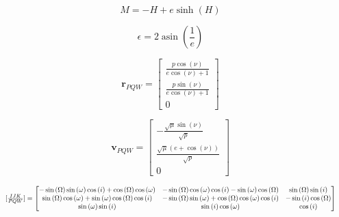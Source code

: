 \documentclass[10pt]{article}
\begin{document}
\begin{minipage}[t]{0.2487\textwidth}
\[M = - H + e \sinh{\left(H \right)}\]
\end{minipage}%
\begin{minipage}[t]{0.2487\textwidth}
\[\epsilon = 2 \operatorname{asin}{\left(\frac{1}{e} \right)}\]
\end{minipage}
\par\smallskip
\noindent\begin{minipage}[t]{0.2487\textwidth}
\[\mathbf{r}_{PQW} = \left[\begin{matrix}\frac{p \cos{\left(\nu \right)}}{e \cos{\left(\nu \right)} + 1}\\\frac{p \sin{\left(\nu \right)}}{e \cos{\left(\nu \right)} + 1}\\0\end{matrix}\right]\]
\end{minipage}%
\begin{minipage}[t]{0.2487\textwidth}
\[\mathbf{v}_{PQW} = \left[\begin{matrix}- \frac{\sqrt{\mu} \sin{\left(\nu \right)}}{\sqrt{p}}\\\frac{\sqrt{\mu} \left(e + \cos{\left(\nu \right)}\right)}{\sqrt{p}}\\0\end{matrix}\right]\]
\end{minipage}%
\begin{minipage}[t]{0.4975\textwidth}
\[\resizebox{\linewidth}{!}{$[\frac{IJK}{PQW}] = \left[\begin{matrix}- \sin{\left(\Omega \right)} \sin{\left(\omega \right)} \cos{\left(i \right)} + \cos{\left(\Omega \right)} \cos{\left(\omega \right)} & - \sin{\left(\Omega \right)} \cos{\left(\omega \right)} \cos{\left(i \right)} - \sin{\left(\omega \right)} \cos{\left(\Omega \right)} & \sin{\left(\Omega \right)} \sin{\left(i \right)}\\\sin{\left(\Omega \right)} \cos{\left(\omega \right)} + \sin{\left(\omega \right)} \cos{\left(\Omega \right)} \cos{\left(i \right)} & - \sin{\left(\Omega \right)} \sin{\left(\omega \right)} + \cos{\left(\Omega \right)} \cos{\left(\omega \right)} \cos{\left(i \right)} & - \sin{\left(i \right)} \cos{\left(\Omega \right)}\\\sin{\left(\omega \right)} \sin{\left(i \right)} & \sin{\left(i \right)} \cos{\left(\omega \right)} & \cos{\left(i \right)}\end{matrix}\right]$}\]
\end{minipage}
\end{document}
